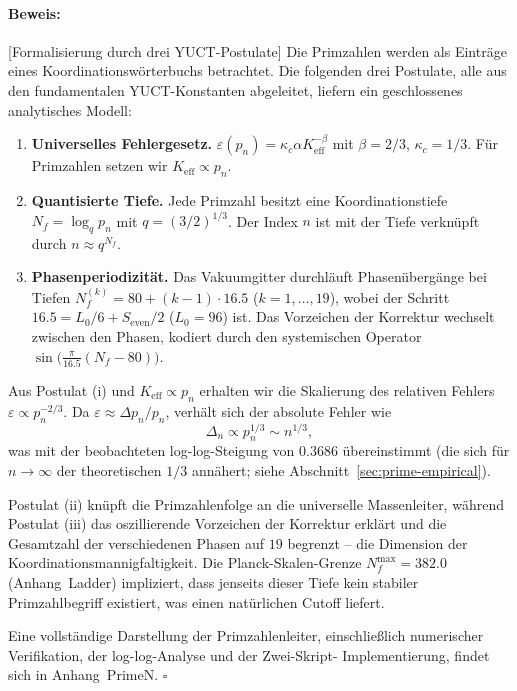 \documentclass[12pt,a4paper]{article}
\theoremstyle{remark}
\renewenvironment{proof}{\paragraph{Beweis:}}{\hfill$\square$}
\begin{document}
	\begin{proof}[Formalisierung durch drei YUCT-Postulate]
		Die Primzahlen werden als Einträge eines Koordinationswörterbuchs betrachtet.
		Die folgenden drei Postulate, alle aus den fundamentalen YUCT-Konstanten
		abgeleitet, liefern ein geschlossenes analytisches Modell:
		\begin{enumerate}[label=(\roman*)]
			\item \textbf{Universelles Fehlergesetz.}
			\(\varepsilon(p_n) = \kappa_c \alpha K_{\mathrm{eff}}^{-\beta}\)
			mit \(\beta = 2/3\), \(\kappa_c = 1/3\). Für Primzahlen setzen wir
			\(K_{\mathrm{eff}} \propto p_n\).
			\item \textbf{Quantisierte Tiefe.} Jede Primzahl besitzt eine
			Koordinationstiefe \(N_f = \log_q p_n\) mit \(q = (3/2)^{1/3}\).
			Der Index \(n\) ist mit der Tiefe verknüpft durch \(n \approx q^{N_f}\).
			\item \textbf{Phasenperiodizität.} Das Vakuumgitter durchläuft
			Phasenübergänge bei Tiefen \(N_f^{(k)} = 80 + (k-1)\cdot 16.5\)
			(\(k=1,\dots,19\)), wobei der Schritt \(16.5 = L_0/6 + S_{\mathrm{even}}/2\)
			(\(L_0=96\)) ist. Das Vorzeichen der Korrektur wechselt zwischen den
			Phasen, kodiert durch den systemischen Operator
			\(\sin\bigl(\frac{\pi}{16.5}(N_f-80)\bigr)\).
		\end{enumerate}
		
		Aus Postulat (i) und \(K_{\mathrm{eff}} \propto p_n\) erhalten wir die
		Skalierung des relativen Fehlers \(\varepsilon \propto p_n^{-2/3}\).
		Da \(\varepsilon \approx \Delta p_n / p_n\), verhält sich der absolute
		Fehler wie
		\[
		\Delta_n \propto p_n^{1/3} \sim n^{1/3},
		\]
		was mit der beobachteten log-log-Steigung von \(0.3686\) übereinstimmt
		(die sich für \(n\to\infty\) der theoretischen \(1/3\) annähert; siehe
		Abschnitt~\ref{sec:prime-empirical}).
		
		Postulat (ii) knüpft die Primzahlenfolge an die universelle Massenleiter,
		während Postulat (iii) das oszillierende Vorzeichen der Korrektur erklärt
		und die Gesamtzahl der verschiedenen Phasen auf \(19\) begrenzt -- die
		Dimension der Koordinationsmannigfaltigkeit. Die Planck-Skalen-Grenze
		\(N_f^{\max} = 382.0\) (Anhang~Ladder) impliziert, dass jenseits dieser
		Tiefe kein stabiler Primzahlbegriff existiert, was einen natürlichen
		Cutoff liefert.
		
		Eine vollständige Darstellung der Primzahlenleiter, einschließlich
		numerischer Verifikation, der log-log-Analyse und der Zwei-Skript-
		Implementierung, findet sich in Anhang~PrimeN.
	\end{proof}
	
\end{document}
